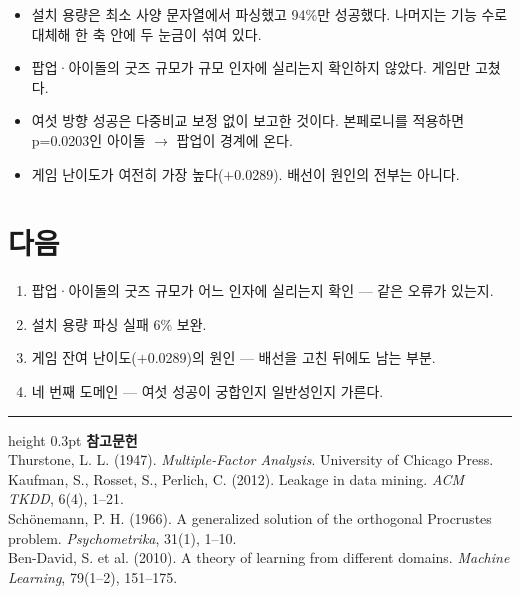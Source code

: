 \documentclass[10pt]{article}
\begin{document}
\begin{itemize}[leftmargin=1.1em,itemsep=0.15em]
\item 설치 용량은 최소 사양 문자열에서 파싱했고 94\%만 성공했다. 나머지는 기능 수로
      대체해 한 축 안에 두 눈금이 섞여 있다.
\item 팝업·아이돌의 굿즈 규모가 규모 인자에 실리는지 확인하지 않았다. 게임만 고쳤다.
\item 여섯 방향 성공은 다중비교 보정 없이 보고한 것이다. 본페로니를 적용하면
      p=0.0203인 아이돌 $\to$ 팝업이 경계에 온다.
\item 게임 난이도가 여전히 가장 높다($+$0.0289). 배선이 원인의 전부는 아니다.
\end{itemize}

\section{다음}

\begin{enumerate}[leftmargin=1.3em,itemsep=0.15em]
\item 팝업·아이돌의 굿즈 규모가 어느 인자에 실리는지 확인 --- 같은 오류가 있는지.
\item 설치 용량 파싱 실패 6\% 보완.
\item 게임 잔여 난이도($+$0.0289)의 원인 --- 배선을 고친 뒤에도 남는 부분.
\item 네 번째 도메인 --- 여섯 성공이 궁합인지 일반성인지 가른다.
\end{enumerate}

\vspace{0.6em}
\hrule height 0.3pt
\vspace{0.5em}
{\footnotesize
\textbf{참고문헌}\\[0.3em]
Thurstone, L. L. (1947). \emph{Multiple-Factor Analysis}. University of Chicago Press.\\[0.15em]
Kaufman, S., Rosset, S., Perlich, C. (2012). Leakage in data mining.
\emph{ACM TKDD}, 6(4), 1--21.\\[0.15em]
Schönemann, P. H. (1966). A generalized solution of the orthogonal Procrustes
problem. \emph{Psychometrika}, 31(1), 1--10.\\[0.15em]
Ben-David, S. et al. (2010). A theory of learning from different domains.
\emph{Machine Learning}, 79(1--2), 151--175.
}
\end{document}
